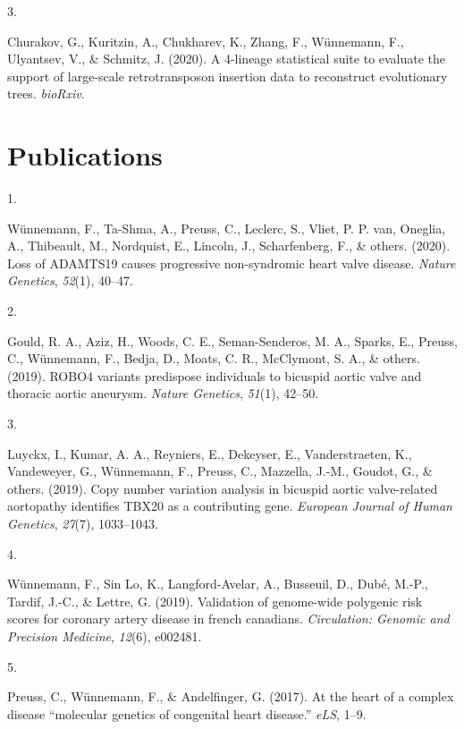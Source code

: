 \documentclass[11pt, a4paper]{awesome-cv}
\newlength{\csllabelwidth}
\newcommand{\CSLLeftMargin}[1]{\parbox[t]{\csllabelwidth}{#1}}
\newcommand{\CSLRightInline}[1]{\parbox[t]{\linewidth - \csllabelwidth}{#1}}
\begin{document}
\leavevmode\hypertarget{ref-churakov20204}{}%
\CSLLeftMargin{3. }
\CSLRightInline{Churakov, G., Kuritzin, A., Chukharev, K., Zhang, F.,
Wünnemann, F., Ulyantsev, V., \& Schmitz, J. (2020). A 4-lineage
statistical suite to evaluate the support of large-scale retrotransposon
insertion data to reconstruct evolutionary trees. \emph{bioRxiv}.}

\hypertarget{publications}{%
\section{\texorpdfstring{
Publications}{ Publications}}\label{publications}}

\hypertarget{bibliography}{}
\leavevmode\hypertarget{ref-wunnemann2020loss}{}%
\CSLLeftMargin{1. }
\CSLRightInline{Wünnemann, F., Ta-Shma, A., Preuss, C., Leclerc, S.,
Vliet, P. P. van, Oneglia, A., Thibeault, M., Nordquist, E., Lincoln,
J., Scharfenberg, F., \& others. (2020). Loss of ADAMTS19 causes
progressive non-syndromic heart valve disease. \emph{Nature Genetics},
\emph{52}(1), 40--47.}

\leavevmode\hypertarget{ref-gould2019robo4}{}%
\CSLLeftMargin{2. }
\CSLRightInline{Gould, R. A., Aziz, H., Woods, C. E., Seman-Senderos, M.
A., Sparks, E., Preuss, C., Wünnemann, F., Bedja, D., Moats, C. R.,
McClymont, S. A., \& others. (2019). ROBO4 variants predispose
individuals to bicuspid aortic valve and thoracic aortic aneurysm.
\emph{Nature Genetics}, \emph{51}(1), 42--50.}

\leavevmode\hypertarget{ref-luyckx2019copy}{}%
\CSLLeftMargin{3. }
\CSLRightInline{Luyckx, I., Kumar, A. A., Reyniers, E., Dekeyser, E.,
Vanderstraeten, K., Vandeweyer, G., Wünnemann, F., Preuss, C., Mazzella,
J.-M., Goudot, G., \& others. (2019). Copy number variation analysis in
bicuspid aortic valve-related aortopathy identifies TBX20 as a
contributing gene. \emph{European Journal of Human Genetics},
\emph{27}(7), 1033--1043.}

\leavevmode\hypertarget{ref-wunnemann2019validation}{}%
\CSLLeftMargin{4. }
\CSLRightInline{Wünnemann, F., Sin Lo, K., Langford-Avelar, A.,
Busseuil, D., Dubé, M.-P., Tardif, J.-C., \& Lettre, G. (2019).
Validation of genome-wide polygenic risk scores for coronary artery
disease in french canadians. \emph{Circulation: Genomic and Precision
Medicine}, \emph{12}(6), e002481.}

\leavevmode\hypertarget{ref-preuss2017heart}{}%
\CSLLeftMargin{5. }
\CSLRightInline{Preuss, C., Wünnemann, F., \& Andelfinger, G. (2017). At
the heart of a complex disease {``molecular genetics of congenital heart
disease.''} \emph{eLS}, 1--9.}
\end{document}
